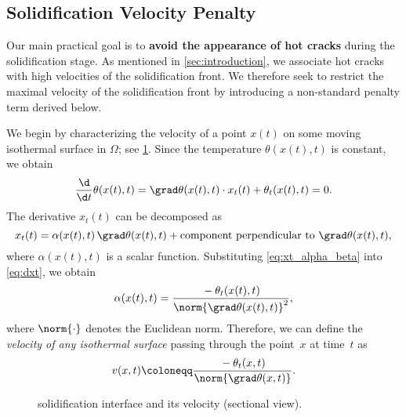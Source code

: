 \subsection{Solidification Velocity Penalty}
\label{subsec:velocity}

Our main practical goal is to \textbf{avoid the appearance of hot cracks} during the solidification stage. 
As mentioned in \cref{sec:introduction}, we associate hot cracks with high velocities of the solidification front.
We therefore seek to restrict the maximal velocity of the solidification front by introducing a non-standard penalty term derived below.

We begin by characterizing the velocity of a point $x(t)$ on some moving isothermal surface in $\Omega$; see \cref{fig:velocity}.
Since the temperature $\theta(x(t),t)$ is constant, we obtain
\begin{equation} \label{eq:dxt}
	\frac{\d}{\d t} \theta(x(t),t) 
	= 
	\grad \theta(x(t),t) \cdot x_t(t) + \theta_t(x(t),t) 
	= 
	0
	.
\end{equation}
The derivative $x_t(t)$ can be decomposed as
\begin{equation} \label{eq:xt_alpha_beta}
	x_t(t) 
	= 
	\alpha(x(t),t) \, \grad \theta(x(t),t) + \text{component perpendicular to } \grad \theta(x(t),t),
\end{equation}
where $\alpha(x(t),t)$ is a scalar function. 
Substituting \eqref{eq:xt_alpha_beta} into \eqref{eq:dxt}, we obtain 
\begin{equation}
	\alpha(x(t),t) 
	= 
	\frac{{}-{} \theta_t(x(t),t)}{\norm{\grad \theta(x(t),t)}^2}
	,
\end{equation}
where $\norm{\cdot}$ denotes the Euclidean norm.
Therefore, we can define the \emph{velocity of any isothermal surface} passing through the point~$x$ at time~$t$ as
\begin{equation}
	v(x,t) 
	\coloneqq 
	\frac{{}-{} \theta_t(x,t)}{\norm{\grad \theta(x,t)}}
	.
\end{equation}

\begin{figure}
	\centering
	
	\caption{ solidification interface and its velocity (sectional view).}
	\label{fig:velocity}
\end{figure}

